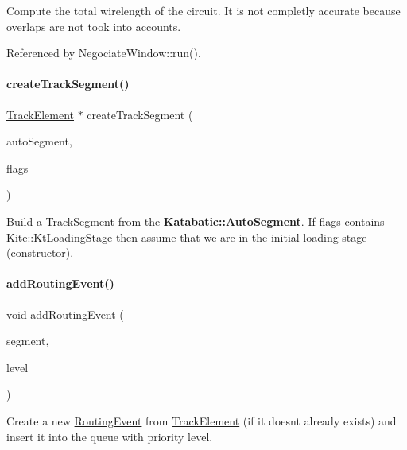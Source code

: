 Compute the total wirelength of the circuit. It is not completly accurate because overlaps are not took into accounts. 

Referenced by Negociate\+Window\+::run().

\mbox{\label{classKite_1_1NegociateWindow_a7bf31fcd4e4007e62454689ef7c553fc}} 
\paragraph{\texorpdfstring{create\+Track\+Segment()}{createTrackSegment()}}
{\footnotesize\ttfamily \mbox{\hyperlink{classKite_1_1TrackElement}{Track\+Element}} $\ast$ create\+Track\+Segment (\begin{DoxyParamCaption}\item[{\textbf{ Auto\+Segment} $\ast$}]{auto\+Segment,  }\item[{unsigned int}]{flags }\end{DoxyParamCaption})}

Build a \mbox{\hyperlink{classKite_1_1TrackSegment}{Track\+Segment}} from the \textbf{ Katabatic\+::\+Auto\+Segment}. If {\ttfamily flags} contains Kite\+::\+Kt\+Loading\+Stage then assume that we are in the initial loading stage (constructor). \mbox{\label{classKite_1_1NegociateWindow_a51ba8e6a122c0cb93174027658cade63}} 
\paragraph{\texorpdfstring{add\+Routing\+Event()}{addRoutingEvent()}}
{\footnotesize\ttfamily void add\+Routing\+Event (\begin{DoxyParamCaption}\item[{\mbox{\hyperlink{classKite_1_1TrackElement}{Track\+Element}} $\ast$}]{segment,  }\item[{unsigned int}]{level }\end{DoxyParamCaption})}

Create a new \mbox{\hyperlink{classKite_1_1RoutingEvent}{Routing\+Event}} from \mbox{\hyperlink{classKite_1_1TrackElement}{Track\+Element}} (if it doesn\textquotesingle{}t already exists) and insert it into the queue with priority {\ttfamily level}. 

